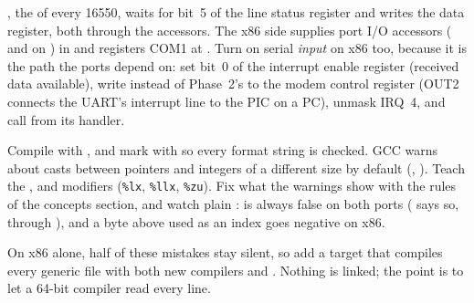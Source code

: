 \documentclass[11pt,a4paper]{article}
\begin{document}
, the  of every 16550, waits for bit~5 of the line status register and writes the data
register, both through the accessors. The x86 side supplies port I/O accessors ( and  on
) in  and registers COM1 at . Turn on serial
\emph{input} on x86 too, because it is the path the ports depend on: set bit~0 of the interrupt enable register
(received data available), write  instead of Phase~2's  to the modem control register (OUT2
connects the UART's interrupt line to the PIC on a PC), unmask IRQ~4, and call  from its handler.

Compile with , and mark  with
 so every format string is checked. GCC warns about casts between pointers
and integers of a different size by default (, ). Teach
 the ,  and  modifiers (\texttt{\%lx}, \texttt{\%llx}, \texttt{\%zu}). Fix what
the warnings show with the rules of the concepts section, and watch plain :  is always
false on both ports ( says so, through ), and a byte above  used as an
index goes negative on x86.

On x86 alone, half of these mistakes stay silent, so add a target that compiles every generic file with both new
compilers and . Nothing is linked; the point is to let a 64-bit compiler read every line.

\end{document}

